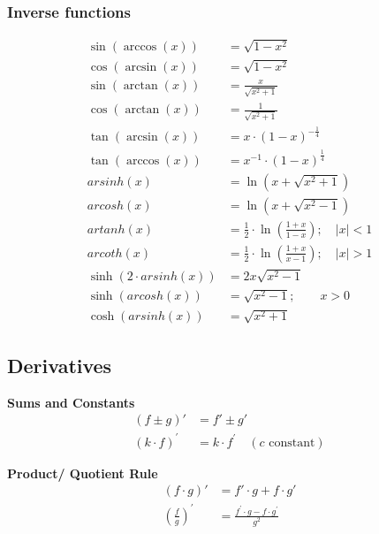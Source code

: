 \subsubsection{Inverse functions}
\begin{align*}
    \sin(\arccos(x))         & = \sqrt{1-x^2}                                                 \\
    \cos(\arcsin(x))         & =\sqrt{1-x^2}                                                  \\
    \sin(\arctan(x))         & =\frac{x}{\sqrt{x^2+1}}                                        \\
    \cos(\arctan(x))         & =\frac{1}{\sqrt{x^2+1}}                                        \\
    \tan(\arcsin(x))         & =x \cdot {(1-x)}^{-\frac{1}{4}}                                \\
    \tan(\arccos(x))         & =x^{-1} \cdot {(1-x)}^{\frac{1}{4}}                            \\
    arsinh(x)                & =\ln(x+\sqrt{x^2+1})                                           \\
    arcosh(x)                & =\ln(x+\sqrt{x^2-1})                                           \\
    artanh(x)                & =\frac{1}{2}\cdot \ln(\frac{1+x}{1-x}); \quad \vert x\vert < 1 \\
    arcoth(x)                & =\frac{1}{2}\cdot \ln(\frac{1+x}{x-1}); \quad \vert x\vert > 1 \\
    \sinh(2 \cdot arsinh(x)) & =2x\sqrt{x^2-1}                                                \\
    \sinh(arcosh(x))         & =\sqrt{x^2-1};\qquad x>0                                       \\
    \cosh(arsinh(x))         & =\sqrt{x^2+1}
\end{align*}

\subsection{Derivatives}
\textbf{Sums and Constants}
\begin{align*}
    (f\pm g)'             & =f'\pm g'                                  \\
    {(k\cdot f)}^{\prime} & =k\cdot f^{\prime}\quad(c\text{ constant})
\end{align*}

\textbf{Product/ Quotient Rule}
\begin{align*}
    (f\cdot g)'                      & =f'\cdot g+f\cdot g'                             \\
    {\left(\frac fg\right)}^{\prime} & =\frac{f^{\prime}\cdot g-f\cdot g^{\prime}}{g^2}
\end{align*}

